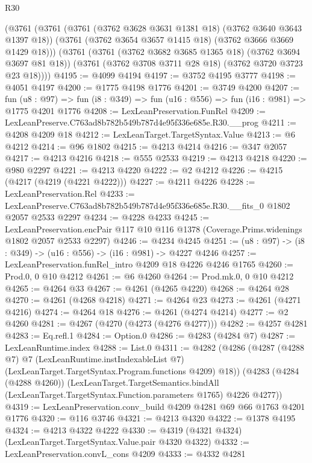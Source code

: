 \begin{lexlean}{R30}
\begin{coremodule}
    (@3761
      (@3761
        (@3761 (@3762 @3628 @3631 @1381 @18) (@3762 @3640 @3643 @1397 @18))
        (@3761 (@3762 @3654 @3657 @1415 @18) (@3762 @3666 @3669 @1429 @18)))
      (@3761
        (@3761 (@3762 @3682 @3685 @1365 @18) (@3762 @3694 @3697 @81 @18))
        (@3761 (@3762 @3708 @3711 @28 @18) (@3762 @3720 @3723 @23 @18))))
@4195 := @4099 @4194
@4197 := @3752 @4195 @3777
@4198 := @4051 @4197
@4200 := @1775 @4198 @1776
@4201 := @3749 @4200
@4207 := fun (u8 : @97) =>
  fun (i8 : @349) => fun (u16 : @556) => fun (i16 : @981) => @1775 @4201 @1776
@4208 := LexLeanPreservation.FunRel
@4209 := LexLeanPreserve.C763ad8b782b549b787d4e95f336e685e.R30.__prog
@4211 := @4208 @4209 @18
@4212 := LexLeanTarget.TargetSyntax.Value
@4213 := @6 @4212
@4214 := @96 @1802
@4215 := @4213 @4214
@4216 := @347 @2057
@4217 := @4213 @4216
@4218 := @555 @2533
@4219 := @4213 @4218
@4220 := @980 @2297
@4221 := @4213 @4220
@4222 := @2 @4212
@4226 := @4215 (@4217 (@4219 (@4221 @4222)))
@4227 := @4211 @4226
@4228 := LexLeanPreservation.Rel
@4233 := LexLeanPreserve.C763ad8b782b549b787d4e95f336e685e.R30.__fits_0 @1802 @2057 @2533 @2297
@4234 := @4228 @4233
@4245 := LexLeanPreservation.encPair
    @117
    @10
    @116
    @1378
    (Coverage.Prims.widenings @1802 @2057 @2533 @2297)
@4246 := @4234 @4245
@4251 := (u8 : @97) -> (i8 : @349) -> (u16 : @556) -> (i16 : @981) -> @4227 @4246
@4257 := LexLeanPreservation.funRel_intro @4209 @18 @4226 @4246 @1765
@4260 := Prod.{0, 0} @10 @4212
@4261 := @6 @4260
@4264 := Prod.mk.{0, 0} @10 @4212
@4265 := @4264 @33
@4267 := @4261 (@4265 @4220)
@4268 := @4264 @28
@4270 := @4261 (@4268 @4218)
@4271 := @4264 @23
@4273 := @4261 (@4271 @4216)
@4274 := @4264 @18
@4276 := @4261 (@4274 @4214)
@4277 := @2 @4260
@4281 := @4267 (@4270 (@4273 (@4276 @4277)))
@4282 := @4257 @4281
@4283 := Eq.refl.{1}
@4284 := Option.{0}
@4286 := @4283 (@4284 @7)
@4287 := LexLeanRuntime.index
@4288 := List.{0}
@4311 := @4282
    (@4286
      (@4287
        (@4288 @7)
        @7
        (LexLeanRuntime.instIndexableList @7)
        (LexLeanTarget.TargetSyntax.Program.functions @4209)
        @18))
    (@4283
      (@4284 (@4288 @4260))
      (LexLeanTarget.TargetSemantics.bindAll
        (LexLeanTarget.TargetSyntax.Function.parameters @1765)
        @4226
        @4277))
@4319 := LexLeanPreservation.conv_build @4209 @4281 @69 @66 @1763 @4201 @1776
@4320 := @116 @3746
@4321 := @4213 @4320
@4322 := @1378 @4195
@4324 := @4213 @4322 @4222
@4330 := @4319 (@4321 @4324) (LexLeanTarget.TargetSyntax.Value.pair @4320 @4322)
@4332 := LexLeanPreservation.convL_cons @4209
@4333 := @4332 @4281

\end{coremodule}
\end{lexlean}
